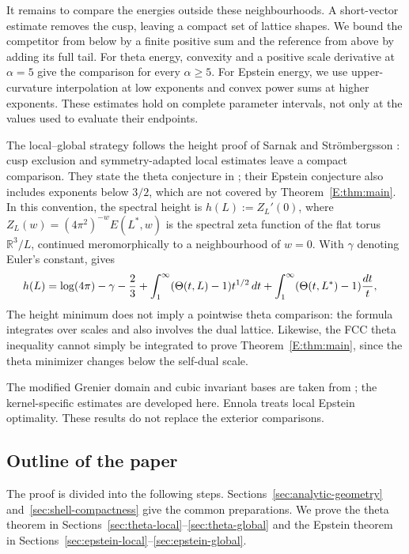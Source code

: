 \documentclass[reqno,english]{amsart}
\theoremstyle{definition}
\newtheorem{open problem}[theorem]{Open Problem}
\theoremstyle{remark}
\theoremstyle{plain}
\newcommand{\R}{{\mathbb R}}
\numberwithin{equation}{section}
\newcommand{\Th}{\Theta}
\begin{document}
It remains to compare the energies outside these neighbourhoods. A
short-vector estimate removes the cusp, leaving a compact set of lattice
shapes. We bound the competitor from below by a finite positive sum and
the reference from above by adding its full tail. For theta energy,
convexity and a positive scale derivative at $\alpha=5$ give the comparison
for every $\alpha\ge5$. For Epstein energy, we use upper-curvature
interpolation at low exponents and convex power sums at higher exponents.
These estimates hold on complete parameter intervals, not only at the
values used to evaluate their endpoints.

The local--global strategy follows the height proof of Sarnak and
Str\"ombergsson \cite[Theorem~2 and Section~4]{SS}: cusp exclusion and
symmetry-adapted local estimates leave a compact comparison. They state the
theta conjecture in \cite[(43)]{SS}; their Epstein conjecture
\cite[(44)]{SS} also includes exponents below $3/2$, which are not covered
by Theorem~\ref{E:thm:main}.
In this convention, the spectral height is $h(L):=Z_L'(0)$, where
$Z_L(w)=(4\pi^2)^{-w}E(L^*,w)$ is the spectral zeta function of the
flat torus $\R^3/L$, continued meromorphically to a neighbourhood of
$w=0$. With $\gamma$ denoting Euler's constant, \cite[(3), (24)--(26)]{SS}
gives
\begin{align}\label{T:eq:heightintegral}
 h(L)&=\log(4\pi)-\gamma-\frac23\notag
+\int_1^\infty(\Th(t,L)-1)t^{1/2}\,dt
       +\int_1^\infty(\Th(t,L^*)-1)\frac{dt}{t},
\end{align}
The height minimum does not imply a pointwise theta comparison: the
formula integrates over scales and also involves the dual lattice.
Likewise, the FCC theta inequality cannot simply be integrated to prove
Theorem~\ref{E:thm:main}, since the theta minimizer changes below the
self-dual scale.

The modified Grenier domain and cubic invariant bases are taken from
\cite[Sections~3--4]{SS}; the kernel-specific estimates are developed here.
Ennola \cite{Ennola} treats local Epstein optimality. These results do not replace
the exterior comparisons.


\subsection{Outline of the paper}\label{sec:paper-outline}
The proof is divided into the following steps. Sections~\ref{sec:analytic-geometry}
and~\ref{sec:shell-compactness} give the common preparations. We prove the
theta theorem in Sections~\ref{sec:theta-local}--\ref{sec:theta-global}
and the Epstein theorem in
Sections~\ref{sec:epstein-local}--\ref{sec:epstein-global}.
\end{document}
